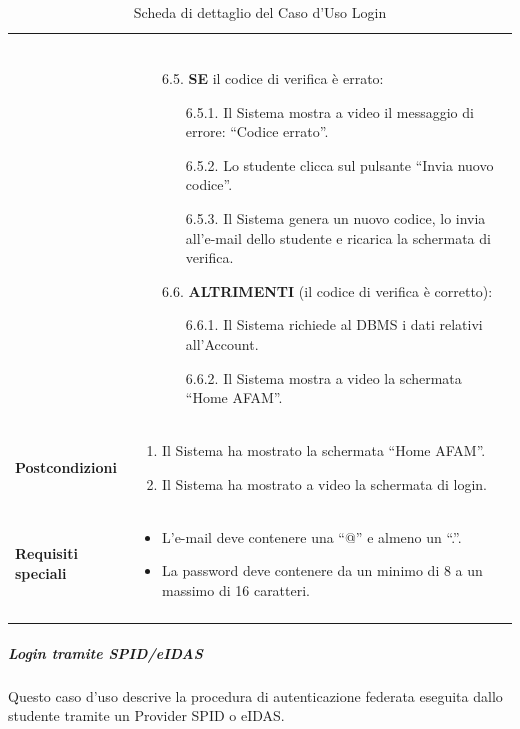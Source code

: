 \documentclass[12pt,a4paper]{article}
\begin{document}
\begin{longtable}{|
>{\columncolor{unipablue}\color{white}\bfseries\raggedright\arraybackslash}p{3.4cm}|
>{\raggedright\arraybackslash}p{11.1cm}|}
\begin{enumerate}
\begin{itemize}
\end{itemize}
\end{enumerate} \\
&
\begin{itemize}
        \item[6.5.] \textbf{SE} il codice di verifica è errato:
        \begin{itemize}
            \item[6.5.1.] Il Sistema mostra a video il messaggio di errore: ``Codice errato''.
            \item[6.5.2.] Lo studente clicca sul pulsante ``Invia nuovo codice''.
            \item[6.5.3.] Il Sistema genera un nuovo codice, lo invia all’e-mail dello studente e ricarica la schermata di verifica.
        \end{itemize}
        \item[6.6.] \textbf{ALTRIMENTI} (il codice di verifica è corretto):
        \begin{itemize}
            \item[6.6.1.] Il Sistema richiede al DBMS i dati relativi all’Account.
            \item[6.6.2.] Il Sistema mostra a video la schermata ``Home AFAM''.
        \end{itemize}
\end{itemize} \\ \hline
\textbf{Postcondizioni} &
\begin{enumerate}
    \item Il Sistema ha mostrato la schermata ``Home AFAM''.
    \item Il Sistema ha mostrato a video la schermata di login.
\end{enumerate} \\ \hline
\textbf{Requisiti speciali} &
\begin{itemize}
    \item L'e-mail deve contenere una ``@'' e almeno un ``.''.
    \item La password deve contenere da un minimo di 8 a un massimo di 16 caratteri.
\end{itemize} \\ \hline
\caption{Scheda di dettaglio del Caso d'Uso Login}
\label{tab:uc_login}\\
\end{longtable}
\normalsize

\newpage
\subparagraph{Login tramite SPID/eIDAS}

Questo caso d'uso descrive la procedura di autenticazione federata eseguita dallo studente tramite un Provider SPID o eIDAS.
\end{document}
